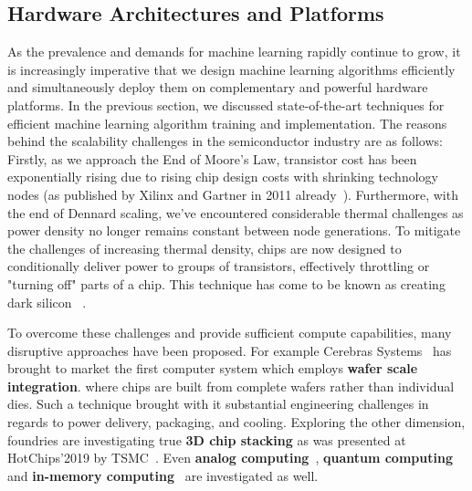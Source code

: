 



\subsection{Hardware Architectures and Platforms}
As the prevalence and demands for machine learning rapidly continue to grow, it is increasingly imperative that we design machine learning algorithms efficiently and simultaneously deploy them on complementary and powerful hardware platforms. In the previous section, we discussed state-of-the-art techniques for efficient machine learning algorithm training and implementation. 
The reasons behind the scalability challenges in the semiconductor industry are as follows:
Firstly, as we approach the End of Moore's Law, transistor cost has been exponentially rising due to rising chip design costs with shrinking technology nodes (as published by Xilinx and Gartner in 2011 already~\cite{trimberger2018three}). Furthermore, with the end of Dennard scaling, we've encountered considerable thermal challenges as power density no longer remains constant between node generations. To mitigate the challenges of increasing thermal density, chips are now designed to conditionally deliver power to groups of transistors, effectively throttling or "turning off" parts of a chip. This technique has come to be known as creating dark silicon ~\cite{esmaeilzadeh2011dark}.

To overcome these challenges and provide sufficient compute capabilities, many disruptive approaches have been proposed. For example Cerebras Systems~\cite{cerebras} has brought to market the first computer system which employs \textbf{wafer scale integration}.  where chips are built from complete wafers rather than individual dies. Such a technique brought with it substantial engineering challenges in regards to power delivery, packaging, and cooling. Exploring the other dimension, foundries are investigating true \textbf{3D chip stacking} as was presented at HotChips'2019 by TSMC~\cite{TSMC}. Even \textbf{analog computing}~\cite{aspinity,yuzuguler2019analog}, \textbf{quantum computing}~\cite{dwave} and \textbf{in-memory computing}~\cite{neuroblade,essera2016convolutional} are investigated as well. %

